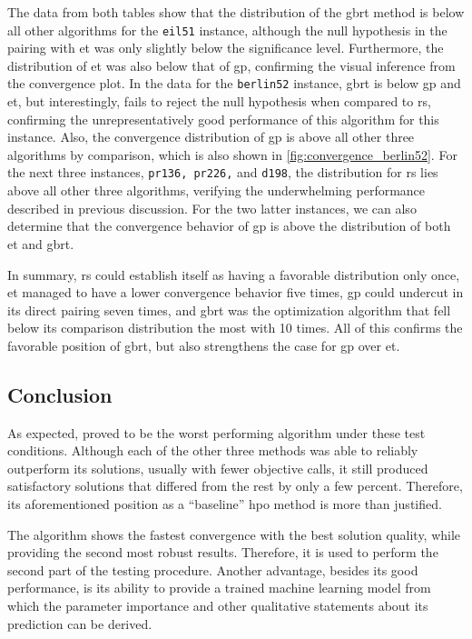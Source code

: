The data from both tables show that the distribution of the \gls{gbrt} method is below all other algorithms for the \texttt{eil51} instance, although the null hypothesis in the pairing with \gls{et} was only slightly below the significance level. Furthermore, the distribution of \gls{et} was also below that of \gls{gp}, confirming the visual inference from the convergence plot. 
In the data for the \texttt{berlin52} instance, \gls{gbrt} is below \gls{gp} and \gls{et}, but interestingly, fails to reject the null hypothesis when compared to \gls{rs}, confirming the unrepresentatively good performance of this algorithm for this instance. Also, the convergence distribution of \gls{gp} is above all other three algorithms by comparison, which is also shown in \cref{fig:convergence_berlin52}.
For the next three instances, \texttt{pr136, pr226,} and \texttt{d198}, the distribution for \gls{rs} lies above all other three algorithms, verifying the underwhelming performance described in previous discussion. For the two latter instances, we can also determine that the convergence behavior of \gls{gp} is above the distribution of both \gls{et} and \gls{gbrt}.

In summary, \gls{rs} could establish itself as having a favorable distribution only once, \gls{et} managed to have a lower convergence behavior five times, \gls{gp} could undercut in its direct pairing seven times, and \gls{gbrt} was the optimization algorithm that fell below its comparison distribution the most with 10 times. All of this confirms the favorable position of \gls{gbrt}, but also strengthens the case for \gls{gp} over \gls{et}.

\subsection{Conclusion}

As expected,  proved to be the worst performing algorithm under these test conditions. Although each of the other three methods was able to reliably outperform its solutions, usually with fewer objective calls, it still produced satisfactory solutions that differed from the rest by only a few percent. Therefore, its aforementioned position as a \enquote{baseline} \gls{hpo} method is more than justified.

The  algorithm shows the fastest convergence with the best solution quality, while providing the second most robust results. Therefore, it is used to perform the second part of the testing procedure. Another advantage, besides its good performance, is its ability to provide a trained machine learning model from which the parameter importance and other qualitative statements about its prediction can be derived.

